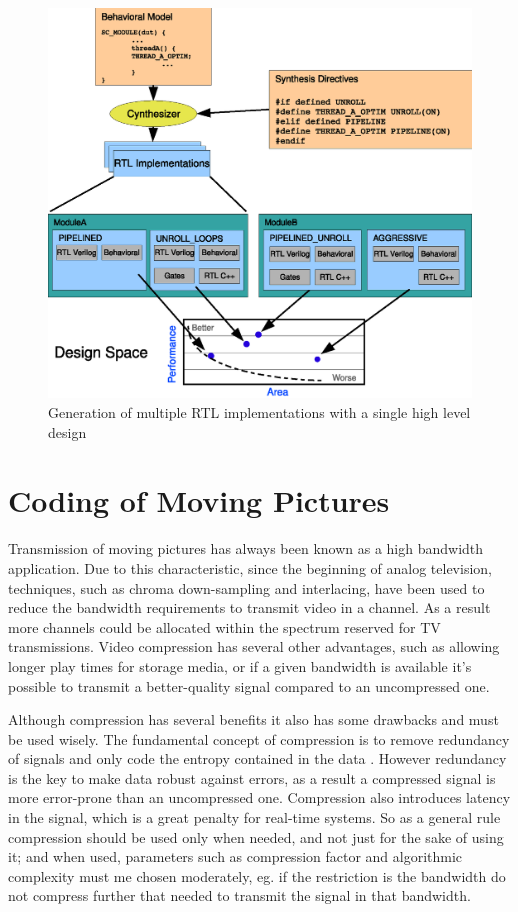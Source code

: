 \documentclass[a4paper, 12pt]{article}
\begin{document}
\begin{figure}[h]
\centering
\includegraphics[width=15cm]{figs/cynthconfigs.eps}
\caption{Generation of multiple RTL implementations with a single high level design}
\label{fig:directive}
\end{figure}


\section{Coding of Moving Pictures}

	Transmission of moving pictures has always been known as a high bandwidth application. Due to this characteristic, since the beginning of analog television, techniques, such as chroma down-sampling and interlacing, have been used to reduce the bandwidth requirements to transmit video in a channel. As a result more channels could be allocated within the spectrum reserved for TV transmissions. Video compression has several other advantages, such as allowing longer play times for storage media, or if a given bandwidth is available it's possible to transmit a better-quality signal compared to an uncompressed one.

	Although compression has several benefits it also has some drawbacks and must be used wisely. The fundamental concept of compression is to remove redundancy of signals and only code the entropy contained in the data \cite{shannon}. However redundancy is the key to make data robust against errors, as a result a compressed signal is more error-prone than an uncompressed one. Compression also introduces latency in the signal, which is a great penalty for real-time systems. So as a general rule compression should be used only when needed, and not just for the sake of using it; and when used, parameters such as compression factor and algorithmic complexity must me chosen moderately, eg. if the restriction is the bandwidth do not compress further that needed to transmit the signal in that bandwidth.
	
\end{document}
